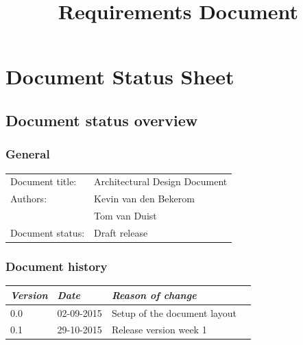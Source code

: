 

\title{Requirements Document}
\newcommand{\TitelAbbr}{RD}
\newcommand{\Version}{0.1}



\supervisors{}





\maketitle


\tableofcontents

\chapter*{Document Status Sheet}
\section*{Document status overview}
\subsection*{General}
\begin{tabular}[!]{ll}
    Document title:     & Architectural Design Document\\
    Authors:           	& Kevin van den Bekerom \\ 
						& Tom van Duist \\
    Document status:    & Draft release\\
\end{tabular}

\subsection*{Document history}
\begin{tabular}[!]{|l|l|l|l|}
    \hline
    \emph{Version}    &   \emph{Date} &  \emph{Reason of change}\\
    \hline
    0.0 & 02-09-2015 &  Setup of the document layout\\    
    \hline
    0.1 & 29-10-2015 & Release version week 1 \\
    \hline
\end{tabular}

\clearpage


